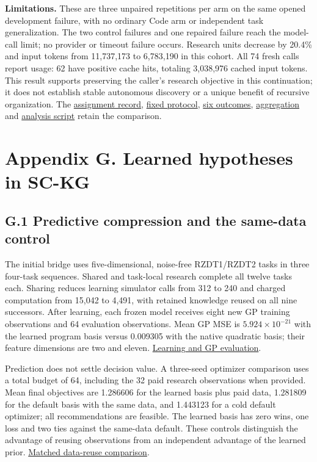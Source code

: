 \documentclass[11pt,a4paper]{article}
\begin{document}
\textbf{Limitations.} These are three unpaired repetitions per arm on the same opened development failure, with no ordinary Code arm or independent task generalization. The two control failures and one repaired failure reach the model-call limit; no provider or timeout failure occurs. Research units decrease by 20.4\% and input tokens from 11,737,173 to 6,783,190 in this cohort. All 74 fresh calls report usage: 62 have positive cache hits, totaling 3,038,976 cached input tokens. This result supports preserving the caller's research objective in this continuation; it does not establish stable autonomous discovery or a unique benefit of recursive organization. The \hyperlink{artifact-131}{assignment record}, \hyperlink{artifact-132}{fixed protocol}, \hyperlink{artifact-133}{six outcomes}, \hyperlink{artifact-134}{aggregation} and \hyperlink{artifact-135}{analysis script} retain the comparison.


\section*{Appendix G. Learned hypotheses in SC-KG}

\subsection*{G.1 Predictive compression and the same-data control}

The initial bridge uses five-dimensional, noise-free RZDT1/RZDT2 tasks in three
four-task sequences. Shared and task-local research complete all twelve tasks
each. Sharing reduces learning simulator calls from 312 to 240 and charged
computation from 15,042 to 4,491, with retained knowledge reused on all nine
successors. After learning, each frozen model receives eight new GP training
observations and 64 evaluation observations. Mean GP MSE is
\(5.924\times10^{-21}\) with the learned program basis versus 0.009305 with the
native quadratic basis; their feature dimensions are two and eleven.
\hyperlink{artifact-136}{Learning and GP evaluation}.


Prediction does not settle decision value. A three-seed optimizer comparison
uses a total budget of 64, including the 32 paid research observations when
provided. Mean final objectives are 1.286606 for the learned basis plus paid
data, 1.281809 for the default basis with the same data, and 1.443123 for a
cold default optimizer; all recommendations are feasible. The learned basis
has zero wins, one loss and two ties against the same-data default. These
controls distinguish the advantage of reusing observations from an independent
advantage of the learned prior.
\hyperlink{artifact-137}{Matched data-reuse comparison}.
\end{document}
